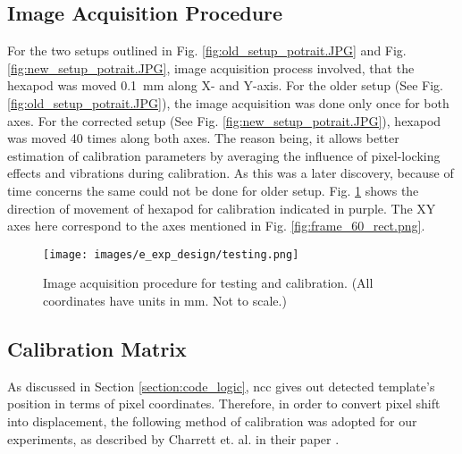     \subsection*{Image Acquisition Procedure}\label{subsection:image_acq_calib}
        For the two setups outlined in Fig. \ref{fig:old_setup_potrait.JPG} and Fig. \ref{fig:new_setup_potrait.JPG}, image acquisition process involved, that the hexapod was moved \SI{0.1}{\milli\meter} along X- and Y-axis. For the older setup (See Fig. \ref{fig:old_setup_potrait.JPG}), the image acquisition was done only once for both axes. For the corrected setup (See Fig. \ref{fig:new_setup_potrait.JPG}), hexapod was moved 40 times along both axes. The reason being, it allows better estimation of calibration parameters by averaging the influence of pixel-locking effects and vibrations during calibration. As this was a later discovery, because of time concerns the same could not be done for older setup. Fig. \ref{fig:testing.png} shows the direction of movement of hexapod for calibration indicated in purple. The XY axes here correspond to the axes mentioned in Fig. \ref{fig:frame_60_rect.png}.

        \begin{figure}[h]
            \centering
            \texttt{[image: images/e\_exp\_design/testing.png]}
            \caption{Image acquisition procedure for testing and calibration. (All coordinates have units in mm. Not to scale.)}
            \label{fig:testing.png}
        \end{figure}


    \subsection*{Calibration Matrix}\label{subsection:calib_matrix}
        As discussed in Section \ref{section:code_logic}, \gls{ncc} gives out detected template's position in terms of pixel coordinates. Therefore, in order to convert pixel shift into displacement, the following method of calibration was adopted for our experiments, as described by Charrett et. al. in their paper \cite{charrett_2018}.

        \vspace{5mm}

